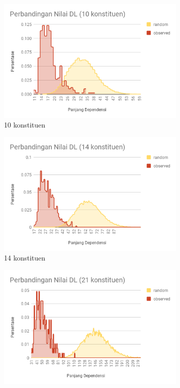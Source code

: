 \begin{figure}
\centering

\begin{subfigure}{.45\textwidth}
  \centering
  \includegraphics[width=1\linewidth]{pics/t10randomobs.png}
  \caption{10 konstituen}
  \label{fig:t10randomobs} 
\end{subfigure}
%
\begin{subfigure}{.45\textwidth}
  \centering
  \includegraphics[width=1\linewidth]{pics/t14randomobs.png}
  \caption{14 konstituen}
  \label{fig:t14randomobs} 
\end{subfigure}
%
\begin{subfigure}{.45\textwidth}
  \centering
  \includegraphics[width=1\linewidth]{pics/t21randomobs.png}

\end{subfigure}
\end{figure}
